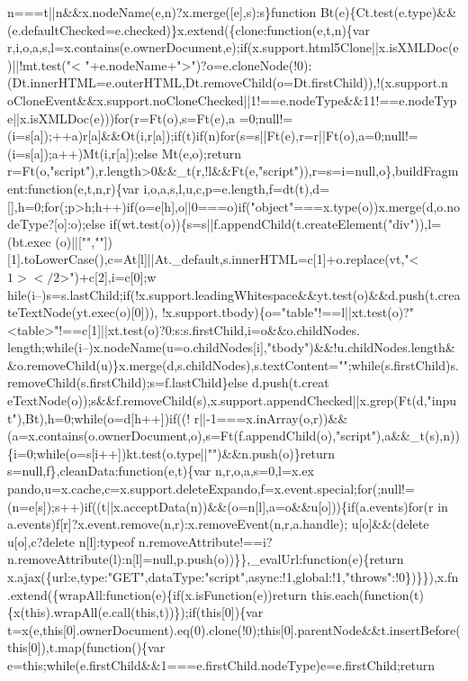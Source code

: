 \begin{DoxyCode}
{       n===t||n&&x.nodeName(e,n)?x.merge([e],s):s\}function
       Bt(e)\{Ct.test(e.type)&&(e.defaultChecked=e.checked)\}x.extend(\{clone:function(e,t,n)\{var
       r,i,o,a,s,l=x.contains(e.ownerDocument,e);if(x.support.html5Clone||x.isXMLDoc(e)||!mt.test("<
      "+e.nodeName+">")?o=e.cloneNode(!0):(Dt.innerHTML=e.outerHTML,Dt.removeChild(o=Dt.firstChild)),!(x.support.n
      oCloneEvent&&x.support.noCloneChecked||1!==e.nodeType&&11!==e.nodeType||x.isXMLDoc(e)))for(r=Ft(o),s=Ft(e),a
      =0;null!=(i=s[a]);++a)r[a]&&Ot(i,r[a]);if(t)if(n)for(s=s||Ft(e),r=r||Ft(o),a=0;null!=(i=s[a]);a++)Mt(i,r[a]);else Mt(e,o);return
       r=Ft(o,"script"),r.length>0&&\_t(r,!l&&Ft(e,"script")),r=s=i=null,o\},buildFragment:function(e,t,n,r)\{var
       i,o,a,s,l,u,c,p=e.length,f=dt(t),d=[],h=0;for(;p>h;h++)if(o=e[h],o||0===o)if("object"===x.type(o))x.merge(d,o.nodeType?[o]:o);else
       if(wt.test(o))\{s=s||f.appendChild(t.createElement("div")),l=(bt.exec
      (o)||["",""])[1].toLowerCase(),c=At[l]||At.\_default,s.innerHTML=c[1]+o.replace(vt,"<$1></$2>")+c[2],i=c[0];w
      hile(i--)s=s.lastChild;if(!x.support.leadingWhitespace&&yt.test(o)&&d.push(t.createTextNode(yt.exec(o)[0])),
      !x.support.tbody)\{o="table"!==l||xt.test(o)?"<table>"!==c[1]||xt.test(o)?0:s:s.firstChild,i=o&&o.childNodes.
      length;while(i--)x.nodeName(u=o.childNodes[i],"tbody")&&!u.childNodes.length&&o.removeChild(u)\}x.merge(d,s.childNodes),s.textContent="";while(s.firstChild)s.removeChild(s.firstChild);s=f.lastChild\}else
       d.push(t.creat
      eTextNode(o));s&&f.removeChild(s),x.support.appendChecked||x.grep(Ft(d,"input"),Bt),h=0;while(o=d[h++])if((!
      r||-1===x.inArray(o,r))&&(a=x.contains(o.ownerDocument,o),s=Ft(f.appendChild(o),"script"),a&&\_t(s),n))\{i=0;while(o=s[i++])kt.test(o.type||"")&&n.push(o)\}return s=null,f\},cleanData:function(e,t)\{var
       n,r,o,a,s=0,l=x.ex
      pando,u=x.cache,c=x.support.deleteExpando,f=x.event.special;for(;null!=(n=e[s]);s++)if((t||x.acceptData(n))&&(o=n[l],a=o&&u[o]))\{if(a.events)for(r in a.events)f[r]?x.event.remove(n,r):x.removeEvent(n,r,a.handle);}
\textcolor{stringliteral}{u[o]&&(delete u[o],c?delete n[l]:typeof
       n.removeAttribute!==i?n.removeAttribute(l):n[l]=null,p.push(o))\}\},\_evalUrl:function(e)\{return
       x.ajax(\{url:e,type:"GET",dataType:"script",async:!1,global:!1,"throws":!0\})\}\}),x.fn.extend(\{wrapAll:function(e)\{if(x.isFunction(e))return
       this.each(function(t)\{x(this).wrapAll(e.call(this,t))\});if(this[0])\{var
       t=x(e,this[0].ownerDocument).eq(0).clone(!0);this[0].parentNode&&t.insertBefore(this[0]),t.map(function()\{var e=this;while(e.firstChild&&1===e.firstChild.nodeType)e=e.firstChild;return
}
\end{DoxyCode}

